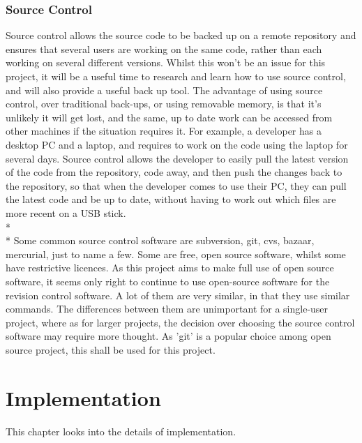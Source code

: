 \documentclass[12pt]{report}
\begin{document}
\subsection{Source Control}\label{subsec:dev_source_control}
Source control allows the source code to be backed up on a remote repository and ensures that several users are working on the same code, rather than each working on several different versions.  Whilst this won't be an issue for this project, it will be a useful time to research and learn how to use source control, and will also provide a useful back up tool.  The advantage of using source control, over traditional back-ups, or using removable memory, is that it's unlikely it will get lost, and the same, up to date work can be accessed from other machines if the situation requires it.  For example, a developer has a desktop PC and a laptop, and requires to work on the code using the laptop for several days.  Source control allows the developer to easily pull the latest version of the code from the repository, code away, and then push the changes back to the repository, so that when the developer comes to use their PC, they can pull the latest code and be up to date, without having to work out which files are more recent on a USB stick.
\\*
\\*
Some common source control software are subversion, git, cvs, bazaar, mercurial, just to name a few.  Some are free, open source software, whilst some have restrictive licences.  As this project aims to make full use of open source software, it seems only right to continue to use open-source software for the revision control software.  A lot of them are very similar, in that they use similar commands.  The differences between them are unimportant for a single-user project, where as for larger projects, the decision over choosing the source control software may require more thought.  As 'git' is a popular choice among open source project, this shall be used for this project.

\chapter{Implementation}
This chapter looks into the details of implementation.
\end{document}
